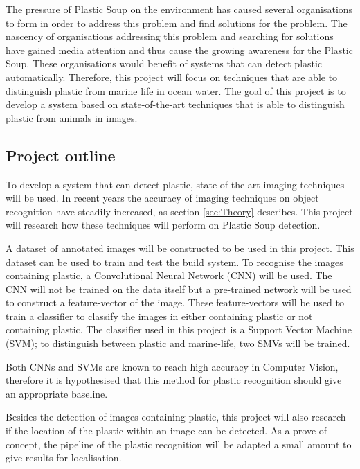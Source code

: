 The pressure of Plastic Soup on the environment has caused several organisations to form in order to address this problem and find solutions for the problem.
The nascency of organisations addressing this problem and searching for solutions have gained media attention and thus cause the growing awareness for the Plastic Soup.
These organisations would benefit of systems that can detect plastic automatically.
Therefore, this project will focus on techniques that are able to distinguish plastic from marine life in ocean water.
The goal of this project is to develop a system based on state-of-the-art techniques that is able to distinguish plastic from animals in images.

\subsection{Project outline}
\label{sec:Intro-Me}
To develop a system that can detect plastic, state-of-the-art imaging techniques will be used.
In recent years the accuracy of imaging techniques on object recognition have steadily increased, as section \ref{sec:Theory} describes.
This project will research how these techniques will perform on Plastic Soup detection.

A dataset of annotated images will be constructed to be used in this project.
This dataset can be used to train and test the build system.
To recognise the images containing plastic, a Convolutional Neural Network (CNN) will be used.
The CNN will not be trained on the data itself but a pre-trained network will be used to construct a feature-vector of the image.
These feature-vectors will be used to train a classifier to classify the images in either containing plastic or not containing plastic.
The classifier used in this project is a Support Vector Machine (SVM); to distinguish between plastic and marine-life, two SMVs will be trained.

Both CNNs and SVMs are known to reach high accuracy in Computer Vision, therefore it is hypothesised that this method for plastic recognition should give an appropriate baseline.

Besides the detection of images containing plastic, this project will also research if the location of the plastic within an image can be detected.
As a prove of concept, the pipeline of the plastic recognition will be adapted a small amount to give results for localisation.

